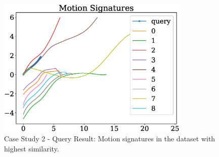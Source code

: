 \begin{figure}
\centering
\includegraphics[width=260pt]{jcise-18/figure/fig_ex_motion_signatures.eps}
  \caption{Case Study 2 - Query Result: Motion signatures in the dataset with highest similarity.}
\label{queryResult}
\end{figure}

